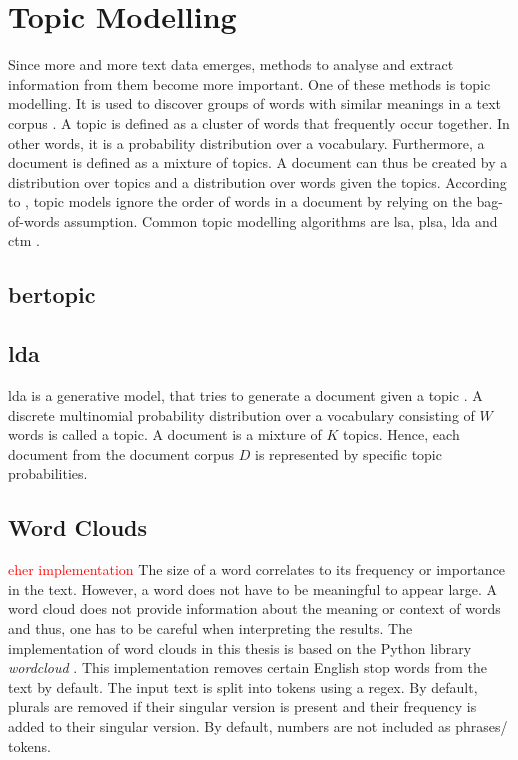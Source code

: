 \section{Topic Modelling}\label{sec:topic-modelling}

Since more and more text data emerges, methods to analyse and extract information from them become more important.
One of these methods is topic modelling.
It is used to discover groups of words with similar meanings in a text corpus \cite{topic_modeling2015}.
A topic is defined as a cluster of words that frequently occur together.
In other words, it is a probability distribution over a vocabulary.
Furthermore, a document is defined as a mixture of topics.
A document can thus be created by a distribution over topics and a distribution over words given the topics.
According to \citeauthor{topic_modeling2015}, topic models ignore the order of words in a document by relying on the bag-of-words assumption.
Common topic modelling algorithms are \ac{lsa}, \ac{plsa}, \ac{lda} and \ac{ctm} \cite{topic_modeling2015}.




\subsection{\ac{bertopic}}\label{subsec:bertopic}

\subsection{\ac{lda}}\label{subsec:latent-dirichlet-allocation}

\ac{lda} is a generative model, that tries to generate a document given a topic \cite{topic_modeling2015}.
A discrete multinomial probability distribution over a vocabulary consisting of $W$ words is called a topic.
A document is a mixture of $K$ topics.
Hence, each document from the document corpus $D$ is represented by specific topic probabilities.

\cite{clusteringDocs2020}

\subsection{Word Clouds}\label{subsec:word-clouds}

\textcolor{red}{eher implementation}
The size of a word correlates to its frequency or importance in the text.
However, a word does not have to be meaningful to appear large.
A word cloud does not provide information about the meaning or context of words and thus, 
one has to be careful when interpreting the results.
The implementation of word clouds in this thesis is based on the Python library \textit{wordcloud} \cite{wordcloud-dev}.
This implementation removes certain English stop words from the text by default.
The input text is split into tokens using a regex.
By default, plurals are removed if their singular version is present and their frequency is added to their singular version.
By default, numbers are not included as phrases/ tokens.